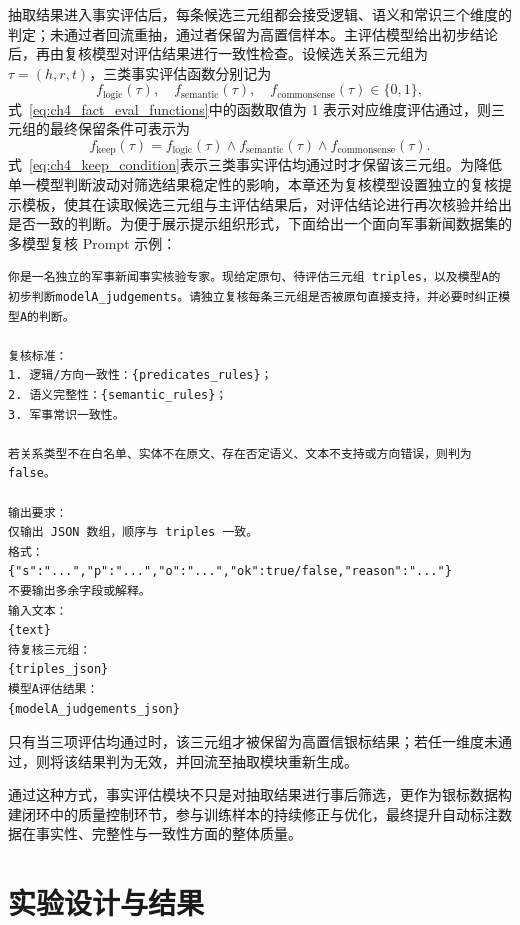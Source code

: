 抽取结果进入事实评估后，每条候选三元组都会接受逻辑、语义和常识三个维度的判定；未通过者回流重抽，通过者保留为高置信样本。主评估模型给出初步结论后，再由复核模型对评估结果进行一致性检查。设候选关系三元组为 $\tau=(h,r,t)$，三类事实评估函数分别记为
\begin{equation}
f_{\text{logic}}(\tau),\quad f_{\text{semantic}}(\tau),\quad f_{\text{commonsense}}(\tau)\in\{0,1\},
\label{eq:ch4_fact_eval_functions}
\end{equation}
式~\eqref{eq:ch4_fact_eval_functions}中的函数取值为 1 表示对应维度评估通过，则三元组的最终保留条件可表示为
\begin{equation}
f_{\text{keep}}(\tau)=f_{\text{logic}}(\tau)\land f_{\text{semantic}}(\tau)\land f_{\text{commonsense}}(\tau).
\label{eq:ch4_keep_condition}
\end{equation}
式~\eqref{eq:ch4_keep_condition}表示三类事实评估均通过时才保留该三元组。为降低单一模型判断波动对筛选结果稳定性的影响，本章还为复核模型设置独立的复核提示模板，使其在读取候选三元组与主评估结果后，对评估结论进行再次核验并给出是否一致的判断。为便于展示提示组织形式，下面给出一个面向军事新闻数据集的多模型复核 Prompt 示例：

\begin{lstlisting}[style=promptbox]
你是一名独立的军事新闻事实核验专家。现给定原句、待评估三元组 triples，以及模型A的初步判断modelA_judgements。请独立复核每条三元组是否被原句直接支持，并必要时纠正模型A的判断。

复核标准：
1. 逻辑/方向一致性：{predicates_rules}；
2. 语义完整性：{semantic_rules}；
3. 军事常识一致性。

若关系类型不在白名单、实体不在原文、存在否定语义、文本不支持或方向错误，则判为 false。

输出要求：
仅输出 JSON 数组，顺序与 triples 一致。
格式：
{"s":"...","p":"...","o":"...","ok":true/false,"reason":"..."}
不要输出多余字段或解释。
输入文本：
{text}
待复核三元组：
{triples_json}
模型A评估结果：
{modelA_judgements_json}
\end{lstlisting}

只有当三项评估均通过时，该三元组才被保留为高置信银标结果；若任一维度未通过，则将该结果判为无效，并回流至抽取模块重新生成。

通过这种方式，事实评估模块不只是对抽取结果进行事后筛选，更作为银标数据构建闭环中的质量控制环节，参与训练样本的持续修正与优化，最终提升自动标注数据在事实性、完整性与一致性方面的整体质量。

\section{实验设计与结果}

